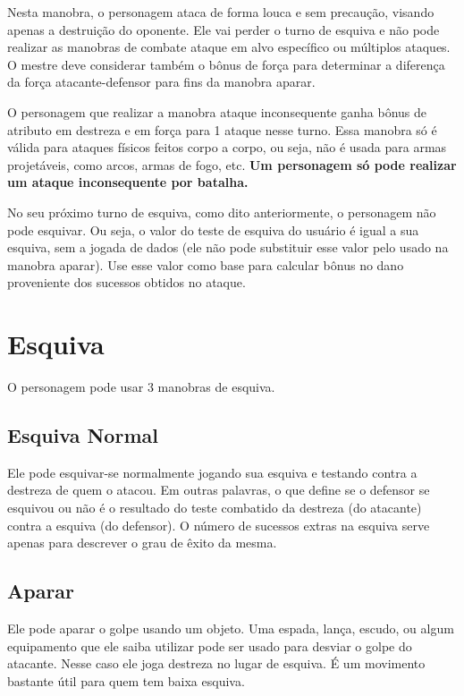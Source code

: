 Nesta manobra, o personagem ataca de forma louca e sem precaução, visando apenas a destruição do oponente. Ele vai perder o turno de esquiva e não pode realizar as manobras de combate ataque em alvo específico ou múltiplos ataques. O mestre deve considerar também o bônus de força para determinar a diferença da força atacante-defensor para fins da manobra aparar.

O personagem que realizar a manobra ataque inconsequente ganha bônus de atributo em destreza e em força para 1 ataque nesse turno. Essa manobra só é válida para ataques físicos feitos corpo a corpo, ou seja, não é usada para armas projetáveis, como arcos, armas de fogo, etc. \textbf{Um personagem só pode realizar um ataque inconsequente por batalha.} 

No seu próximo turno de esquiva, como dito anteriormente, o personagem não pode esquivar. Ou seja, o valor do teste de esquiva do usuário é igual a sua esquiva, sem a jogada de dados (ele não pode substituir esse valor pelo usado na manobra aparar). Use esse valor como base para calcular bônus no dano proveniente dos sucessos obtidos no ataque.

\section{Esquiva}

O personagem pode usar 3 manobras de esquiva.

\subsection{Esquiva Normal}

Ele pode esquivar-se normalmente jogando sua esquiva e testando contra a destreza de quem o atacou. Em outras palavras, o que define se o defensor se esquivou ou não é o resultado do teste combatido da destreza (do atacante) contra a esquiva (do defensor). O número de sucessos extras na esquiva serve apenas para descrever o grau de êxito da mesma.

\subsection{Aparar}

Ele pode aparar o golpe usando um objeto. Uma espada, lança, escudo, ou algum equipamento que ele saiba utilizar pode ser usado para desviar o golpe do atacante. Nesse caso ele joga destreza no lugar de esquiva. É um movimento bastante útil para quem tem baixa esquiva. %

